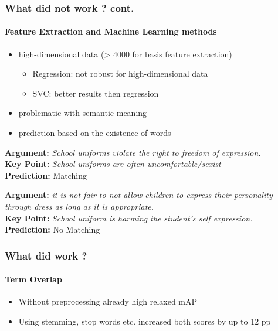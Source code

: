 \documentclass[english,handout]{mlutalk}
\begin{document}
\begin{frame}
  \frametitle{What did not work ? cont. }
  \framesubtitle{Feature Extraction and Machine Learning methods}
    
    	\begin{itemize}
      \item high-dimensional data (> 4000 for basis feature extraction)
      	\begin{itemize}
      		\item Regression: not robust for high-dimensional data
      		\item SVC: better results then regression
      	\end{itemize}
	\end{itemize}
	
    \begin{itemize}
      \item problematic with semantic meaning
      \item prediction based on the existence of words
	\end{itemize}
   
    \begin{example}
      \textbf{Argument:} \textit{School uniforms violate the right to freedom of expression.}\\
      \textbf{Key Point:} \textit{School uniforms are often uncomfortable/sexist}\\
      \textbf{Prediction:} Matching
    \end{example}
    
     \begin{example}
      \textbf{Argument:} \textit{it is not fair to not allow children to express their personality through dress as long as it is appropriate.}\\
      \textbf{Key Point:} \textit{School uniform is harming the student's self expression.}\\
      \textbf{Prediction:} No Matching
    \end{example}

\end{frame}

\begin{frame}
  \frametitle{What did work ?}
  \framesubtitle{Term Overlap}
    
    \begin{itemize}
      \item Without preprocessing already high relaxed mAP
      \item Using stemming, stop words etc. increased both scores by up to 12 pp 
    \end{itemize}

\end{frame}
\end{document}
